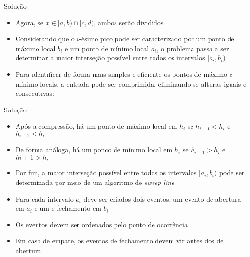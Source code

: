 \begin{frame}[fragile]{Solução}

    \begin{itemize}
        \item Agora, se $x\in [a, b)\cap [c, d)$, ambos serão divididos

        \item Considerando que o $i$-ésimo pico pode ser caracterizado por um ponto de máximo local
            $b_i$ e um ponto de mínimo local $a_i$, o problema passa a ser determinar a maior
            interseção possível entre todos os intervalos $[a_i, b_i)$
            
        \item Para identificar de forma mais simples e eficiente os pontos de máximo e mínimo
            locais, a entrada pode ser comprimida, eliminando-se alturas iguais e consecutivas:

            \vspace{0.1in}

    \end{itemize}

\end{frame}

\begin{frame}[fragile]{Solução}

    \begin{itemize}
        \item Após a compressão, há um ponto de máximo local em $h_i$ se $h_{i - 1} < h_i$ e
            $h_{i + 1} < h_i$

        \item De forma análoga, há um ponco de mínimo local em $h_i$ se $h_{i - 1} > h_i$ e
            $h{i + 1} > h_i$

        \item Por fim, a maior interseção possível entre todos os intervalos $[a_i, b_i)$ pode
            ser determinada por meio de um algoritmo de \textit{sweep line}

        \item Para cada intervalo $a_i$ deve ser criados dois eventos: um evento de abertura em
            $a_i$ e um e fechamento em $b_i$

        \item Os eventos devem ser ordenados pelo ponto de ocorrência

        \item Em caso de empate, os eventos de fechamento devem vir antes dos de abertura

    \end{itemize}

\end{frame}


